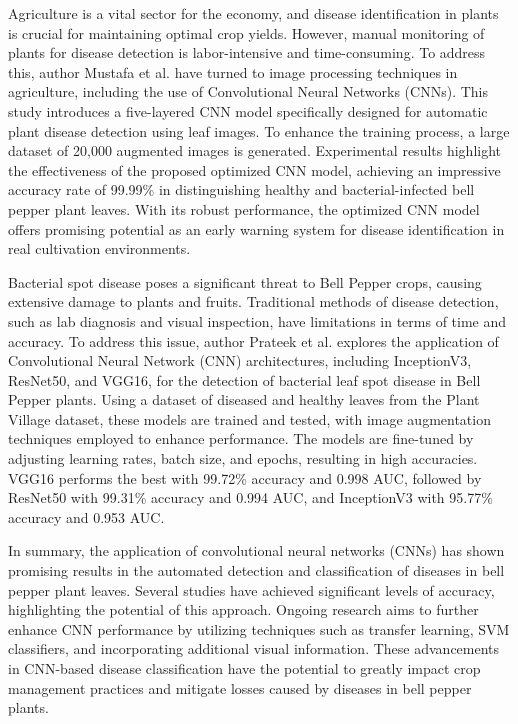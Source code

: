\documentclass[conference]{IEEEtran}
\begin{document}
Agriculture is a vital sector for the economy, and disease identification in plants is crucial for maintaining optimal crop yields. However, manual monitoring of plants for disease detection is labor-intensive and time-consuming. To address this, author Mustafa et al. \cite{mustafa2023pepper} have turned to image processing techniques in agriculture, including the use of Convolutional Neural Networks (CNNs). This study introduces a five-layered CNN model specifically designed for automatic plant disease detection using leaf images. To enhance the training process, a large dataset of 20,000 augmented images is generated. Experimental results highlight the effectiveness of the proposed optimized CNN model, achieving an impressive accuracy rate of 99.99\% in distinguishing healthy and bacterial-infected bell pepper plant leaves. With its robust performance, the optimized CNN model offers promising potential as an early warning system for disease identification in real cultivation environments.

Bacterial spot disease poses a significant threat to Bell Pepper crops, causing extensive damage to plants and fruits. Traditional methods of disease detection, such as lab diagnosis and visual inspection, have limitations in terms of time and accuracy. To address this issue, author Prateek et al. \cite{9565945} explores the application of Convolutional Neural Network (CNN) architectures, including InceptionV3, ResNet50, and VGG16, for the detection of bacterial leaf spot disease in Bell Pepper plants. Using a dataset of diseased and healthy leaves from the Plant Village dataset, these models are trained and tested, with image augmentation techniques employed to enhance performance. The models are fine-tuned by adjusting learning rates, batch size, and epochs, resulting in high accuracies. VGG16 performs the best with 99.72\% accuracy and 0.998 AUC, followed by ResNet50 with 99.31\% accuracy and 0.994 AUC, and InceptionV3 with 95.77\% accuracy and 0.953 AUC.


In summary, the application of convolutional neural networks (CNNs) has shown promising results in the automated detection and classification of diseases in bell pepper plant leaves. Several studies have achieved significant levels of accuracy, highlighting the potential of this approach. Ongoing research aims to further enhance CNN performance by utilizing techniques such as transfer learning, SVM classifiers, and incorporating additional visual information. These advancements in CNN-based disease classification have the potential to greatly impact crop management practices and mitigate losses caused by diseases in bell pepper plants.
\end{document}
